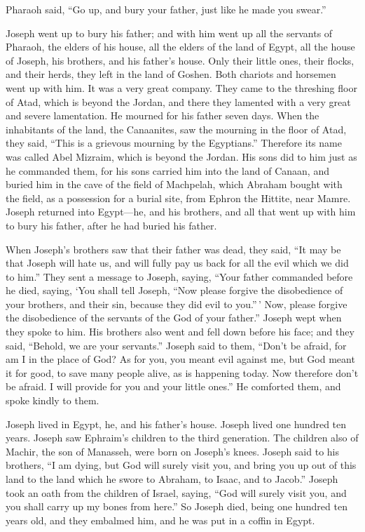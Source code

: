  Pharaoh said, ``Go up, and bury your father, just like he
made you swear.''

 Joseph went up to bury his father; and with him went up
all the servants of Pharaoh, the elders of his house, all the elders of
the land of Egypt,  all the house of Joseph, his brothers,
and his father's house. Only their little ones, their flocks, and their
herds, they left in the land of Goshen.  Both chariots and
horsemen went up with him. It was a very great company. 
They came to the threshing floor of Atad, which is beyond the Jordan,
and there they lamented with a very great and severe lamentation. He
mourned for his father seven days.  When the inhabitants
of the land, the Canaanites, saw the mourning in the floor of Atad, they
said, ``This is a grievous mourning by the Egyptians.'' Therefore its
name was called Abel Mizraim, which is beyond the Jordan.
 His sons did to him just as he commanded them,
 for his sons carried him into the land of Canaan, and
buried him in the cave of the field of Machpelah, which Abraham bought
with the field, as a possession for a burial site, from Ephron the
Hittite, near Mamre.  Joseph returned into Egypt---he,
and his brothers, and all that went up with him to bury his father,
after he had buried his father.

 When Joseph's brothers saw that their father was dead,
they said, ``It may be that Joseph will hate us, and will fully pay us
back for all the evil which we did to him.''  They sent a
message to Joseph, saying, ``Your father commanded before he died,
saying,  `You shall tell Joseph, ``Now please forgive the
disobedience of your brothers, and their sin, because they did evil to
you.''\,' Now, please forgive the disobedience of the servants of the
God of your father.'' Joseph wept when they spoke to him.
 His brothers also went and fell down before his face;
and they said, ``Behold, we are your servants.''  Joseph
said to them, ``Don't be afraid, for am I in the place of God?
 As for you, you meant evil against me, but God meant it
for good, to save many people alive, as is happening today.
 Now therefore don't be afraid. I will provide for you
and your little ones.'' He comforted them, and spoke kindly to them.

 Joseph lived in Egypt, he, and his father's house.
Joseph lived one hundred ten years.  Joseph saw Ephraim's
children to the third generation. The children also of Machir, the son
of Manasseh, were born on Joseph's knees.  Joseph said to
his brothers, ``I am dying, but God will surely visit you, and bring you
up out of this land to the land which he swore to Abraham, to Isaac, and
to Jacob.''  Joseph took an oath from the children of
Israel, saying, ``God will surely visit you, and you shall carry up my
bones from here.''  So Joseph died, being one hundred ten
years old, and they embalmed him, and he was put in a coffin in Egypt.
